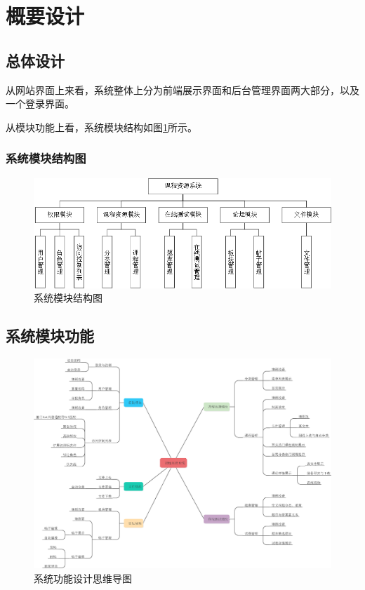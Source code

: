 \documentclass[titlepage,UTF8,linespread=1.5]{ctexart}
\begin{document}
\section{概要设计}
\subsection{总体设计}
从网站界面上来看，系统整体上分为前端展示界面和后台管理界面两大部分，以及一个登录界面。\par
从模块功能上看，系统模块结构如图\ref{fig:struct-module}所示。\par
\subsubsection{系统模块结构图}
\begin{figure}[H]
    \centering
    \includegraphics[width=150mm]{struct-module.png}
    \caption{系统模块结构图}
    \label{fig:struct-module}
\end{figure}
\subsection{系统模块功能}
\begin{figure}[H]
    \centering
    \includegraphics[width=150mm]{mind-overall.eps}
    \caption{系统功能设计思维导图}
    \label{fig:mind-overall}
\end{figure}
\end{document}
